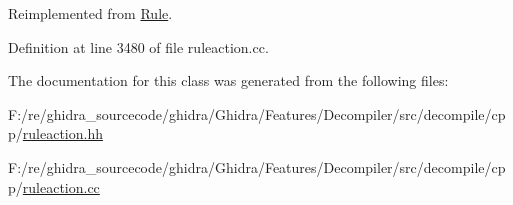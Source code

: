 Reimplemented from \mbox{\hyperlink{class_rule_a4023bfc7825de0ab866790551856d10e}{Rule}}.



Definition at line 3480 of file ruleaction.\+cc.



The documentation for this class was generated from the following files\+:\begin{DoxyCompactItemize}
\item 
F\+:/re/ghidra\+\_\+sourcecode/ghidra/\+Ghidra/\+Features/\+Decompiler/src/decompile/cpp/\mbox{\hyperlink{ruleaction_8hh}{ruleaction.\+hh}}\item 
F\+:/re/ghidra\+\_\+sourcecode/ghidra/\+Ghidra/\+Features/\+Decompiler/src/decompile/cpp/\mbox{\hyperlink{ruleaction_8cc}{ruleaction.\+cc}}\end{DoxyCompactItemize}
